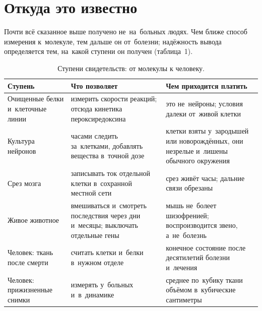 \documentclass[11pt,a4paper,landscape,twocolumn]{article}
\newcommand{\facts}{\par\vspace{3pt}{\sffamily\bfseries\small\color{cM}Опорные факты}\par\vspace{-2pt}}
\begin{document}
\section{Откуда это известно}
Почти всё сказанное выше получено не~на~больных людях. Чем ближе способ измерения к~молекуле, тем дальше он от~болезни; надёжность вывода определяется тем, на~какой ступени он получен (таблица~1).
\begin{table}[t]\small\centering
\begin{tabular}{@{}>{\raggedright\arraybackslash}p{}>{\raggedright\arraybackslash}p{}>{\raggedright\arraybackslash}p{}@{}}
\toprule
\textsf{\textbf{Ступень}} & \textsf{\textbf{Что позволяет}} & \textsf{\textbf{Чем приходится платить}}\\
\midrule
Очищенные белки и~клеточные линии & измерить скорости реакций; отсюда кинетика пероксиредоксина & это не~нейроны; условия далеки от~живой клетки\\
\addlinespace
Культура нейронов & часами следить за~клетками, добавлять вещества в~точной дозе & клетки взяты у~зародышей или новорождённых, они незрелые и~лишены обычного окружения\\
\addlinespace
Срез мозга & записывать ток отдельной клетки в~сохранной местной сети & срез живёт часы; дальние связи обрезаны\\
\addlinespace
Живое животное & вмешиваться и~смотреть последствия через дни и~месяцы; выключать отдельные гены & мышь не~болеет шизофренией; воспроизводится звено, а~не~болезнь\\
\addlinespace
Человек: ткань после смерти & считать клетки и~белки в~нужном отделе & конечное состояние после десятилетий болезни и~лечения\\
\addlinespace
Человек: прижизненные снимки & измерять у~больных и~в~динамике & среднее по~кубику ткани объёмом в~кубические сантиметры\\
\bottomrule
\end{tabular}
\caption{Ступени свидетельств: от молекулы к человеку.}
\end{table}
\facts
\end{document}
